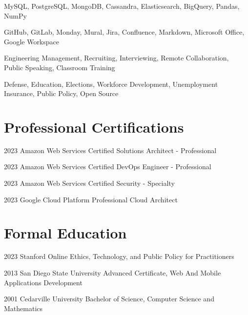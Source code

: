 \documentclass{article}
\begin{document}
  {MySQL, PostgreSQL, MongoDB, Cassandra, Elasticsearch, BigQuery, Pandas, NumPy}

  {GitHub, GitLab, Monday, Mural, Jira, Confluence, Markdown, Microsoft Office, Google Workspace}

  {Engineering Management, Recruiting, Interviewing, Remote Collaboration, Public Speaking, Classroom Training}

  {Defense, Education, Elections, Workforce Development, Unemployment Insurance, Public Policy, Open Source}


\vspace{5mm}

\section{Professional Certifications}

\education
  {2023}
  {Amazon Web Services}
  {Certified Solutions Architect - Professional}

\education
  {2023}
  {Amazon Web Services}
  {Certified DevOps Engineer - Professional}

\education
  {2023}
  {Amazon Web Services}
  {Certified Security - Specialty}

\education
  {2023}
  {Google Cloud Platform}
  {Professional Cloud Architect}


\vspace{5mm}

\section{Formal Education}

\education
  {2023}
  {Stanford Online}
  {Ethics, Technology, and Public Policy for Practitioners}

\education
  {2013}
  {San Diego State University}
  {Advanced Certificate, Web And Mobile Applications Development}

\education
  {2001}
  {Cedarville University}
  {Bachelor of Science, Computer Science and Mathematics}


\credits
\end{document}
